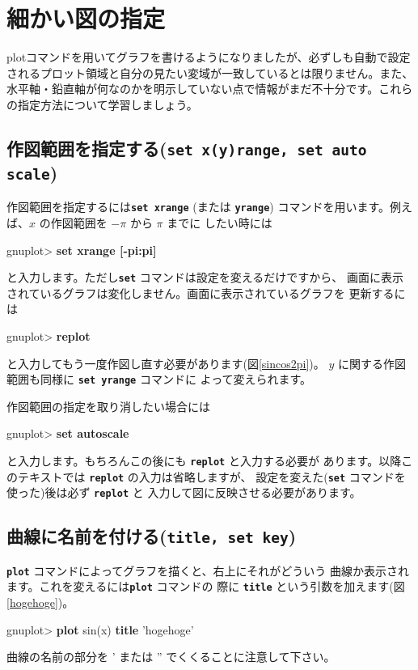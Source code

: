 \documentclass[a4j]{ujarticle} %
\newenvironment{terminal}{%
  \begin{center}
   \begin{minipage}{.8\textwidth}
    \setlength{\FrameSep}{.5\FrameSep}%
    \begin{framed}\ttfamily\small%
     \setlength\baselineskip{.85\baselineskip}%
}{%
    \end{framed}
   \end{minipage}
  \end{center}%
}
\begin{document}
\section{細かい図の指定}
plotコマンドを用いてグラフを書けるようになりましたが、必ずしも自動で設定されるプロット領域と自分の見たい変域が一致しているとは限りません。また、水平軸・鉛直軸が何なのかを明示していない点で情報がまだ不十分です。これらの指定方法について学習しましょう。

\subsection{作図範囲を指定する({\tt\bf set x(y)range, set auto scale})}
作図範囲を指定するには{\tt\bf set xrange} (または {\tt\bf yrange})
コマンドを用います。例えば、$x$ の作図範囲を $-\pi$ から $\pi$ までに
したい時には
\begin{terminal}
gnuplot> {\bf set xrange [-pi:pi]}
\end{terminal}
と入力します。ただし{\tt\bf set} コマンドは設定を変えるだけですから、
画面に表示されているグラフは変化しません。画面に表示されているグラフを
更新するには
\begin{terminal}
gnuplot> {\bf replot}
\end{terminal}
と入力してもう一度作図し直す必要があります(図\ref{sincos2pi})。
$y$ に関する作図範囲も同様に {\tt\bf set yrange} コマンドに
よって変えられます。

作図範囲の指定を取り消したい場合には
\begin{terminal}
gnuplot> {\bf set autoscale}
\end{terminal}
と入力します。もちろんこの後にも {\tt\bf replot} と入力する必要が
あります。以降このテキストでは {\tt\bf replot} の入力は省略しますが、
設定を変えた({\tt\bf set} コマンドを使った)後は必ず {\tt\bf replot} と
入力して図に反映させる必要があります。

\subsection{曲線に名前を付ける({\tt\bf title, set key})}
{\tt\bf plot} コマンドによってグラフを描くと、右上にそれがどういう
曲線か表示されます。これを変えるには{\tt\bf plot} コマンドの
際に {\tt\bf title} という引数を加えます(図\ref{hogehoge})。
\begin{terminal}
gnuplot> {\bf plot} sin(x) {\bf title} 'hogehoge'
\end{terminal}
曲線の名前の部分を ' または '' でくくることに注意して下さい。
\end{document}
